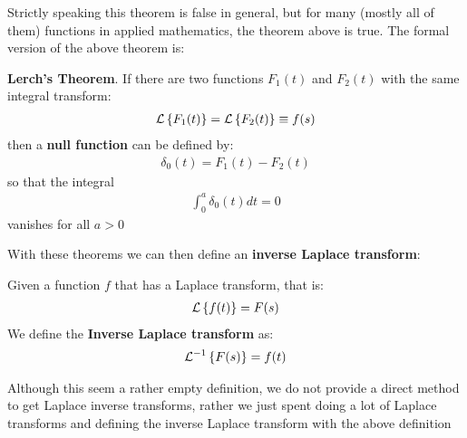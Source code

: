 Strictly speaking this theorem is false in general, but for many (mostly all of them) functions in applied mathematics, the theorem above is true.
The formal version of the above theorem is:
\begin{thm}
	\textbf{Lerch's Theorem}. If there are two functions $F_1(t)$ and $F_2(t)$ with the same integral transform:
	\begin{align*}
	\mathcal{L}\left\lbrace F_1(t) \right\rbrace = \mathcal{L}\left\lbrace F_2(t) \right\rbrace \equiv f(s)
	\end{align*}
	then a \textbf{null function} can be defined by:
	\begin{align*}
	\delta_0(t) = F_1(t) - F_2(t)
	\end{align*}
	so that the integral
	\begin{align*}
	\int_0^a \delta_0(t) dt = 0
	\end{align*}
	vanishes for all $a>0$
\end{thm} 

With these theorems we can then define an \textbf{inverse Laplace transform}:

\begin{define}
	Given a function $f$ that has a Laplace transform, that is:
	\begin{align*}
	\mathcal{L}\left\lbrace f(t) \right\rbrace = F(s)
	\end{align*}
	We define the \textbf{Inverse Laplace transform} as:
	\begin{align*}
		\mathcal{L}^{-1}\left\lbrace F(s) \right\rbrace = f(t)
	\end{align*}
\end{define}
Although this seem a rather empty definition, we do not provide a direct method to get Laplace inverse transforms, rather we just spent doing a lot of Laplace transforms and defining the inverse Laplace transform with the above definition
